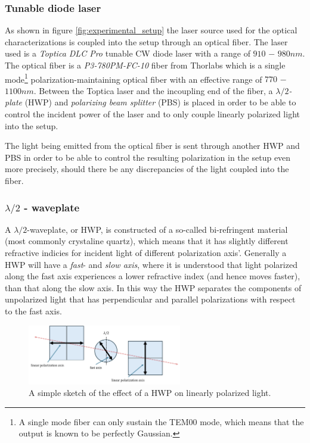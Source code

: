 \subsubsection{Tunable diode laser}

As shown in figure \ref{fig:experimental_setup} the laser source used for the optical characterizations is coupled into the setup through an optical fiber. The laser used is a \emph{Toptica DLC Pro} tunable CW diode laser with a range of $910$ $-$ $980nm$. The optical fiber is a \emph{P3-780PM-FC-10} fiber from Thorlabs which is a single mode\footnote{A single mode fiber can only sustain the TEM00 mode, which means that the output is known to be perfectly Gaussian.} polarization-maintaining optical fiber with an effective range of $770$ $-$ $1100nm$. Between the Toptica laser and the incoupling end of the fiber, a $\lambda/2$\emph{-plate} (HWP) and \emph{polarizing beam splitter} (PBS) is placed in order to be able to control the incident power of the laser and to only couple linearly polarized light into the setup.  

The light being emitted from the optical fiber is sent through another HWP and PBS in order to be able to control the resulting polarization in the setup even more precisely, should there be any discrepancies of the light coupled into the fiber. 

\subsubsection{$\lambda / 2$ - waveplate}

A $\lambda/2$-waveplate, or HWP, is constructed of a so-called bi-refringent material (most commonly crystaline quartz), which means that it has slightly different refractive indicies for incident light of different polarization axis'. Generally a HWP will have a \emph{fast}- and \emph{slow axis}, where it is understood that light polarized along the fast axis experiences a lower refractive index (and hence moves faster), than that along the slow axis. In this way the HWP separates the components of unpolarized light that has perpendicular and parallel polarizations with respect to the fast axis. 

\begin{figure}[h!]
    \centering
    \includegraphics[width=0.6\textwidth]{figures/HWP.pdf}
    \caption{A simple sketch of the effect of a HWP on linearly polarized light.}
    \label{fig:HWP}
\end{figure}

